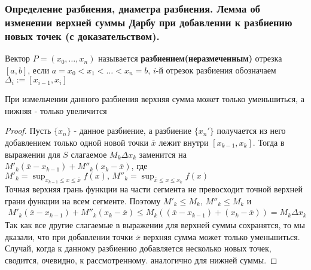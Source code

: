 \documentclass[10pt]{article}
\begin{document}
    \subsubsection{Определение разбиения, диаметра разбиения. Лемма об изменении верхней суммы Дарбу при добавлении к разбиению новых точек (с доказательством).}
    \begin{definition}
        Вектор $P = (x_0, \ldots, x_n)$ называется \textbf{разбиением(неразмеченным)} отрезка $[a, b]$, если $a = x_0 < x_1 < \ldots < x_n = b$, $i$-й отрезок разбиения обозначаем $\Delta_i := [x_{i-1}, x_i]$  
    \end{definition}
    \begin{lemma}
        При измельчении данного разбиения верхняя сумма может только уменьшиться, а нижняя - только увеличится
    \end{lemma}
    \begin{proof}
        Пусть $\{x_n\}$ - данное разбиение, а разбиение $\{x_n'\}$ получается из него добавлением только одной новой точки $\overline{x}$ лежит внутри $[x_{k-1}, x_k]$. Тогда в выражении для $S$ слагаемое $M_k \Delta x_k$ заменится на $M'_k(\overline{x}-x_{k-1}) + M''_k (x_k - \overline{x})$, где $M'_k = \sup_{x_{k-1} \leq x \leq \overline{x}} f(x),\,M''_k=\sup_{\overline{x} \leq x \leq x_k} f(x)$\\
        Точная верхняя грань функции на части сегмента не превосходит точной верхней грани функции на всем сегменте. Поэтому $M'_k \leq M_k,\,M''_k \leq M_k$ и
        \begin{gather*}
            M'_k(\overline{x} - x_{k-1}) + M''_k(x_k - \overline{x}) \leq M_k((\overline{x} - x_{k-1}) + (x_k -     \overline{x})) = M_k \Delta x_k
        \end{gather*}
        Так как все другие слагаемые в выражении для верхней суммы сохранятся, то мы дказали, что при добавлении точки $\overline{x}$ верхняя сумма может только уменьшиться. Случай, когда к данному разбиению добавляется несколько новых точек, сводится, очевидно, к рассмотренному. аналогично для нижней суммы. 
    \end{proof}
\end{document}
